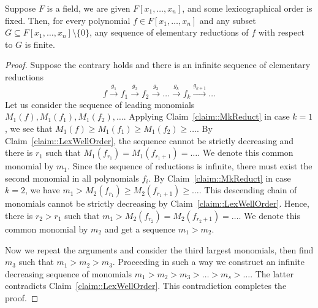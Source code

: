 \begin{claim}
\label{claim::ReductFin}
Suppose $F$ is a field, we are given $F[x_1,\ldots,x_n]$, and some lexicographical order is fixed.
Then, for every polynomial $f\in F[x_1,\ldots,x_n]$ and any subset $G\subseteq F[x_1,\ldots,x_n]\setminus\{0\}$, any sequence of elementary reductions of $f$ with respect to $G$ is finite.
\end{claim}
\begin{proof}
Suppose the contrary holds and there is an infinite sequence of elementary reductions
\[
f\stackrel{g_1}{\longrightarrow}f_1\stackrel{g_2}{\longrightarrow}f_2\stackrel{g_3}{\longrightarrow}\ldots \stackrel{g_k}{\longrightarrow}f_k\stackrel{g_{k+1}}{\longrightarrow}\ldots
\]
Let us consider the sequence of leading monomials $M_1(f),M_1(f_1), M_1(f_2),\ldots$.
Applying Claim~\ref{claim::MkReduct} in case $k = 1$, we see that $M_1(f) \geqslant M_1(f_1)\geqslant M_1(f_2) \geqslant \ldots$.
By Claim~\ref{claim::LexWellOrder}, the sequence cannot be strictly decreasing and there is $r_1$ such that $M_1(f_{r_1}) = M_1(f_{r_1+1})=\ldots$.
We denote this common monomial by $m_1$.
Since the sequence of reductions is infinite, there must exist the second monomial in all polynomials $f_i$.
By Claim~\ref{claim::MkReduct} in case $k = 2$, we have $m_1 > M_2(f_{r_1})\geqslant M_2(f_{r_1 + 1})\geqslant \ldots$.
This descending chain of monomials cannot be strictly decreasing by Claim~\ref{claim::LexWellOrder}.
Hence, there is $r_2 > r_1$ such that $m_1 > M_2(f_{r_2}) = M_2(f_{r_2+1})=\ldots$.
We denote this common monomial by $m_2$ and get a sequence $m_1 > m_2$.

Now we repeat the arguments and consider the third largest monomials, then find $m_3$ such that $m_1 > m_2 > m_3$.
Proceeding in such a way we construct an infinite decreasing sequence of monomials $m_1 > m_2 > m_3 > \ldots > m_s> \ldots$.
The latter contradicts Claim~\ref{claim::LexWellOrder}.
This contradiction completes the proof.
\end{proof}

